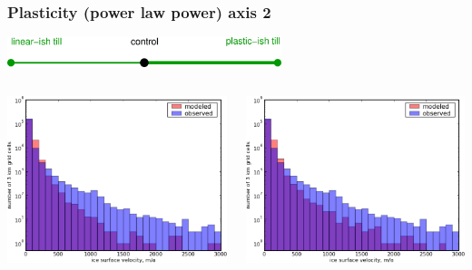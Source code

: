 \documentclass{beamer}
\begin{document}
\begin{frame}
  \frametitle{Plasticity (power law power) axis 2}

\vspace{-0.1in}
\begin{center}
  \includegraphics[width=0.6\textwidth]{plastic_axis}
\end{center}

\vspace{-0.1in}
\begin{columns}
\begin{column}{0.33\textwidth}
\begin{center}
  \includegraphics[width=1.0\textwidth]{g3km_3_50_98_hist}
\end{center}
\end{column}
\begin{column}{0.33\textwidth}
\begin{center}
  \includegraphics[width=1.0\textwidth]{g3km_3_25_98_hist}

\end{center}
\end{column}
\end{columns}
\end{frame}
\end{document}

